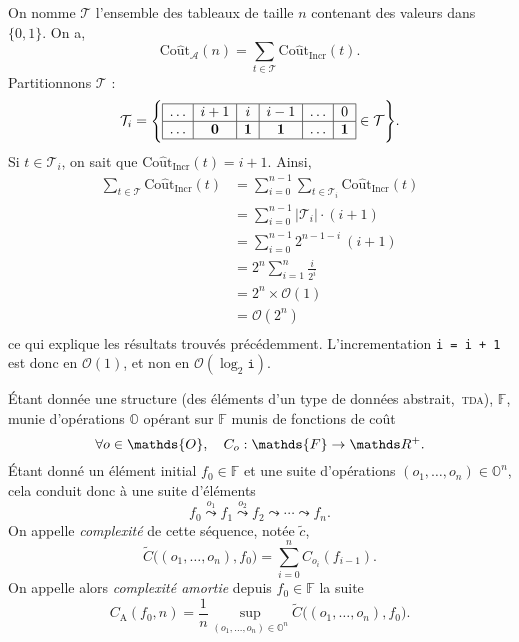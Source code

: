 {{		On nomme $\mathcal{T}$\/ l'ensemble des tableaux de taille $n$\/ contenant des valeurs dans $\{0,1\}$. On a, \[
			\mathrm{Co\hat ut}_\mathcal{A}(n) = \sum_{t \in \mathcal{T}} \mathrm{Co\hat ut}_\text{Incr}(t)
		.\]Partitionnons $\mathcal{T}$\/ : \[
			\mathcal{T}_i = \Bigg\{
				\begin{array}{|c|c|c|c|c|c|}
					\hline
					\ldots & i + 1 & i & i - 1 & \ldots & 0\\ \hline
					\ldots & \mathbf{0} & \mathbf{1} & \mathbf{1} & \ldots & \mathbf{1}\\ \hline
				\end{array} \in \mathcal{T}
			\Bigg\}
		.\]  Si $t \in \mathcal{T}_i$, on sait que $\mathrm{Co\hat ut}_\text{Incr}(t) = i + 1$.
		Ainsi,
		\begin{align*}
			\sum_{t \in \mathcal{T}} \mathrm{Co\hat ut}_\text{Incr}(t)
			&= \sum_{i=0}^{n-1} \sum_{t \in \mathcal{T}_i} \mathrm{Co\hat ut}_\text{Incr}(t) \\
			&= \sum_{i=0}^{n-1} |\mathcal{T}_i| \cdot (i + 1) \\
			&= \sum_{i=0}^{n-1} 2^{n - 1 - i}\:(i+1) \\
			&= 2^n \sum_{i=1}^n \frac{i}{2^i}\\
			&= 2^n \times \mathcal{O}(1) \\
			&= \mathcal{O}(2^n) \\
		\end{align*}
		ce qui explique les résultats trouvés précédemment.
		L'incrementation \texttt{i = i + 1} est donc en $\mathcal{O}(1)$, et non en $\mathcal{O}(\log_2 \texttt{i})$.
	
		\begin{defn}
			Étant donnée une structure (des éléments d'un type de données abstrait,~\textsc{tda}), $\mathds{F}$, munie d'opérations $\mathds{O}$ opérant sur $\mathds{F}$\/ munis de fonctions de coût \[
				\forall o \in \mathds{O}, \quad C_o : \mathds{F} \to \R^+
			.\]
			Étant donné un élément initial $f_0 \in \mathds{F}$\/ et une suite d'opérations $(o_1, \ldots, o_n) \in \mathds{O}^n$, cela conduit donc à une suite d'éléments \[
				f_0 \overset{o_1}\leadsto f_1 \overset{o_2}\leadsto f_2 \leadsto \cdots \leadsto f_n.
			\] On appelle \textit{complexité} de cette séquence, notée $\tilde c$, \[
				\tilde C\big((o_1, \ldots, o_n), f_0\big)  = \sum_{i=0}^n C_{o_i}(f_{i-1})
			.\]
			On appelle alors \textit{complexité amortie} depuis $f_0 \in \mathds{F}$\/ la suite \[
				C_\mathrm{A}(f_0, n) = \frac{1}{n} \sup_{(o_1, \ldots, o_n) \in \mathds{O}^n} \tilde C\big((o_1, \ldots, o_n), f_0\big)
			.\]
		\end{defn}
	
}}
